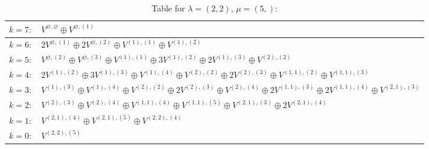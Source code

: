 \documentclass[a4paper,12pt]{article}
\begin{document}
\renewcommand{\arraystretch}{1.6} 
\begin{table}[H]
\centering
\caption{Table for $\lambda = (2, 2)$, $\mu = (5,)$:}
\begin{tabular}{|>{\centering\arraybackslash}p{15cm}|}
\hline
 $k = 7: \quad V^{\varnothing, \varnothing} \oplus V^{\varnothing, (1)} $ \\ \hline
 $k = 6: \quad 2 V^{\varnothing, (1)} \oplus 2 V^{\varnothing, (2)} \oplus V^{(1), (1)} \oplus V^{(1), (2)} $ \\ \hline
 $k = 5: \quad V^{\varnothing, (2)} \oplus V^{\varnothing, (3)} \oplus V^{(1), (1)} \oplus 3 V^{(1), (2)} \oplus 2 V^{(1), (3)} \oplus V^{(2), (2)} $ \\ \hline
 $k = 4: \quad 2 V^{(1), (2)} \oplus 3 V^{(1), (3)} \oplus V^{(1), (4)} \oplus V^{(2), (2)} \oplus 2 V^{(2), (3)} \oplus V^{(1, 1), (2)} \oplus V^{(1, 1), (3)} $ \\ \hline
 $k = 3: \quad V^{(1), (3)} \oplus V^{(1), (4)} \oplus V^{(2), (2)} \oplus 2 V^{(2), (3)} \oplus V^{(2), (4)} \oplus 2 V^{(1, 1), (3)} \oplus 2 V^{(1, 1), (4)} \oplus V^{(2, 1), (3)} $ \\ \hline
 $k = 2: \quad V^{(2), (3)} \oplus V^{(2), (4)} \oplus V^{(1, 1), (4)} \oplus V^{(1, 1), (5)} \oplus V^{(2, 1), (3)} \oplus 2 V^{(2, 1), (4)} $ \\ \hline
 $k = 1: \quad V^{(2, 1), (4)} \oplus V^{(2, 1), (5)} \oplus V^{(2, 2), (4)} $ \\ \hline
 $k = 0: \quad V^{(2, 2), (5)} $ \\ \hline
\end{tabular}
\end{table}
\end{document}
